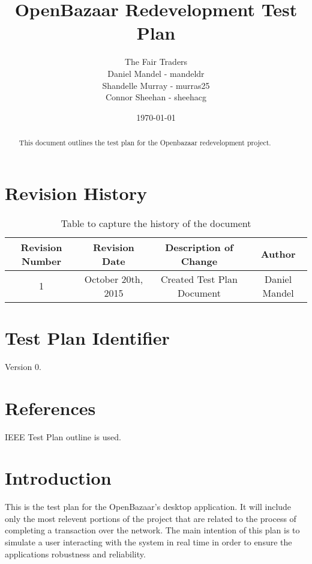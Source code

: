 \documentclass{article}
\begin{document}
\title{OpenBazaar Redevelopment Test Plan}
\author{The Fair Traders \\ Daniel Mandel - mandeldr \\ Shandelle Murray - murras25 \\ Connor Sheehan - sheehacg}
\date{\today}
\maketitle

\begin{abstract}
This document outlines the test plan for the Openbazaar redevelopment project.
\end{abstract}

\clearpage

\tableofcontents

\clearpage

\section*{Revision History}

\begin{table}[h!]
\centering
\begin{tabular}{||c c c c||} 
 \hline
 Revision Number & Revision Date & Description of Change & Author \\ [0.5ex] 
 \hline\hline
 1 & October 20th, 2015 & Created Test Plan Document & Daniel Mandel \\ [1ex] 
 \hline
\end{tabular}
\caption{Table to capture the history of the document}
\label{table:1}
\end{table}


\section*{Test Plan Identifier}
Version 0.

\section*{References}
IEEE Test Plan outline is used.

\section*{Introduction}
This is the test plan for the OpenBazaar's desktop application.
It will include only the most relevent portions of the project that are related to the process of completing a transaction over the network.
The main intention of this plan is to simulate a user interacting with the system in real time in order to ensure the applications robustness and reliability.
\end{document}
